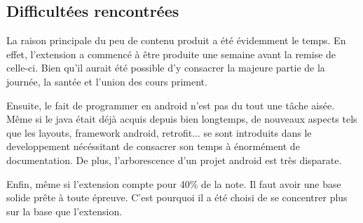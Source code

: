 \subsection{Difficultées rencontrées}
\begin{flushleft}
La raison principale du peu de contenu produit a été évidemment le temps. En effet, l'extension a commencé à être produite une semaine avant la remise de celle-ci. Bien qu'il aurait été possible d'y consacrer la majeure partie de la journée, la santée et l'union des cours priment.
\end{flushleft}
\begin{flushleft}
Ensuite, le fait de programmer en android n'est pas du tout une tâche aisée. Même si le java était déjà acquis depuis bien longtemps, de nouveaux aspects tels que les layouts, framework android, retrofit... se sont introduits dans le developpement nécéssitant de consacrer son temps à énormément de documentation. De plus, l'arborescence d'un projet android est très disparate.
\end{flushleft}
\begin{flushleft}
Enfin, même si l'extension compte pour 40\% de la note. Il faut avoir une base solide prête à toute épreuve. C'est pourquoi il a été choisi de se concentrer plus sur la base que l'extension.
\end{flushleft}